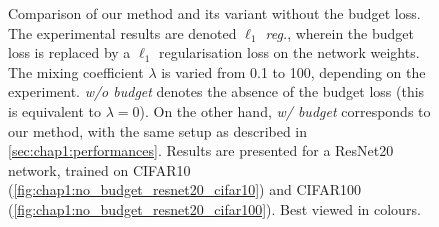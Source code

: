 \begin{figure}
  \centering
    \caption{ Comparison of our method and its variant without the budget loss.
    The experimental results are denoted \emph{$\ell_1$ reg.}, wherein the budget
    loss is replaced by a $\ell_1$ regularisation loss on the network weights. The
    mixing coefficient $\lambda$ is varied from 0.1 to 100, depending on the
    experiment. \emph{w/o budget} denotes the absence of the budget loss (this
    is equivalent to $\lambda = 0$). On the other hand, \emph{w/ budget}
    corresponds to our method, with the same setup as described in
    \cref{sec:chap1:performances}. Results are presented for a ResNet20 network,
    trained on CIFAR10 (\cref{fig:chap1:no_budget_resnet20_cifar10}) and
    CIFAR100 (\cref{fig:chap1:no_budget_resnet20_cifar100}). Best viewed in
    colours.}       
    \label{fig:chap1:no_budget_resnet20}
\end{figure}
  
    

